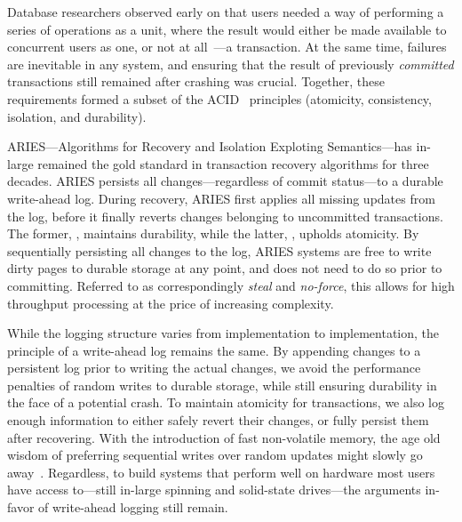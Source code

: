 Database researchers observed early on that users needed a way of
performing a series of operations as a unit, where the result would either be
made available to concurrent users as one, or not at all~\cite{bernstein}---a
transaction. At the same time, failures are inevitable in any system, and
ensuring that the result of previously \textit{committed} transactions still
remained after crashing was crucial. Together, these requirements formed
a subset of the ACID~\cite{acid} principles (atomicity, consistency, isolation,
and durability).

ARIES---Algorithms for Recovery and Isolation Exploting
Semantics\cite{aries}---has in-large remained the gold standard in transaction
recovery algorithms for three decades. ARIES persists all changes---regardless
of commit status---to a durable write-ahead log. During recovery, ARIES first
applies all missing updates from the log, before it finally reverts changes
belonging to uncommitted transactions. The former, , maintains
durability, while the latter, , upholds atomicity. By sequentially
persisting all changes to the log, ARIES systems are free to write dirty pages
to durable storage at any point, and does not need to do so prior to committing.
Referred to as correspondingly \textit{steal} and \textit{no-force}, this allows
for high throughput processing at the price of increasing complexity.

While the logging structure varies from implementation to implementation, the
principle of a write-ahead log remains the same. By appending changes to a
persistent log prior to writing the actual changes, we avoid the performance
penalties of random writes to durable storage, while still ensuring durability
in the face of a potential crash. To maintain atomicity for transactions, we
also log enough information to either safely revert their changes, or fully
persist them after recovering. With the introduction of fast non-volatile
memory, the age old wisdom of preferring sequential writes over random updates
might slowly go away~\cite{mars, wbl}. Regardless, to build systems that perform
well on hardware most users have access to---still in-large spinning and
solid-state drives---the arguments in-favor of write-ahead logging still remain.
